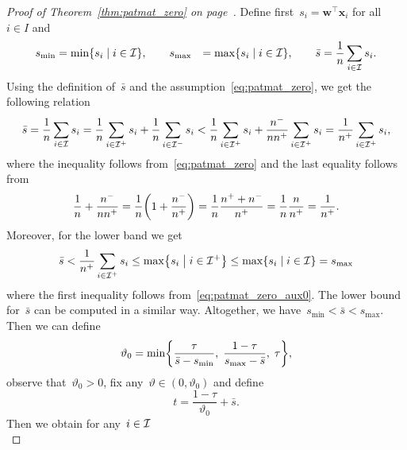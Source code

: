 \patmatzero*
\begin{proof}[Proof of Theorem~\ref{thm:patmat_zero} on page~\pageref{thm:patmat_zero}]
  Define first~$s_i = \bm{w}^\top \bm{x}_i$ for all~$i \in I$ and
  \begin{equation*}
    \begin{aligned}
      s_{\min} & = \min \Set{s_i}{i \in \I}, \qquad
      s_{\max} & = \max \Set{s_i}{i \in \I}, \qquad
      \bar{s} & = \frac{1}{n} \sum_{i \in \I} s_i. \\
    \end{aligned}
  \end{equation*}
  Using the definition of~$\bar{s}$ and the assumption~\eqref{eq:patmat_zero}, we get the following relation
  \begin{equation}\label{eq:patmat_zero_aux0}
    \bar{s}
      = \frac{1}{n} \sum_{i \in \mathcal{I}} s_i
      = \frac{1}{n}\sum_{i \in \mathcal{I}^+} s_i + \frac{1}{n} \sum_{i \in \mathcal{I}^-} s_i
      < \frac{1}{n} \sum_{i \in \mathcal{I}^+} s_i + \frac{n^-}{nn^+} \sum_{i \in \mathcal{I}^+} s_i
      = \frac{1}{n^+} \sum_{i \in \mathcal{I}^+} s_i,
  \end{equation}
  where the inequality follows from~\eqref{eq:patmat_zero} and the last equality follows from
  \begin{equation*}
    \frac{1}{n} + \frac{n^-}{nn^+}
      = \frac{1}{n} \Brac{1 + \frac{n^-}{n^+}} 
      = \frac{1}{n} \frac{n^+ + n^-}{n^+}
      = \frac{1}{n} \frac{n}{n^+}
      = \frac{1}{n^+}.
  \end{equation*}
  Moreover, for the lower band we get
  \begin{equation*}
    \bar{s}
      < \frac{1}{n^+} \sum_{i \in \I^+} s_i
      \le \max \Set{s_i}{i \in \I^+}
      \le \max \Set{s_i}{i \in \I}
      = s_{\max}
  \end{equation*}
  where the first inequality follows from~\eqref{eq:patmat_zero_aux0}. The lower bound for~$\bar{s}$ can be computed in a similar way. Altogether, we have~$s_{\min} < \bar{s} < s_{\max}$. Then we can define
  \begin{equation*}
    \vartheta_0 = \min\Brac[c]{\frac{\tau}{\bar{s} - s_{\min}}, \; \frac{1-\tau}{s_{\max}-\bar{s}}, \; \tau},
  \end{equation*}
  observe that~$\vartheta_0>0$, fix any~$\vartheta\in(0,\vartheta_0)$ and define
  \begin{equation*}
    t = \frac{1-\tau}{\vartheta_0} + \bar{s}.
  \end{equation*}
  Then we obtain for any~$i \in \mathcal{I}$
  \begin{equation}\label{eq:patmat_zero_aux1}

\end{equation}
\end{proof}
